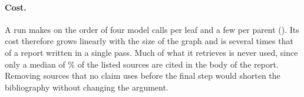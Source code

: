 \paragraph{Cost.}
A \sys{} run makes on the order of four model calls per leaf and a few per parent (). Its cost therefore grows linearly with the size of the graph and is several times that of a report written in a single pass. Much of what it retrieves is never used, since only a median of \atUsedShare\% of the listed sources are cited in the body of the report. Removing sources that no claim uses before the final step would shorten the bibliography without changing the argument.

